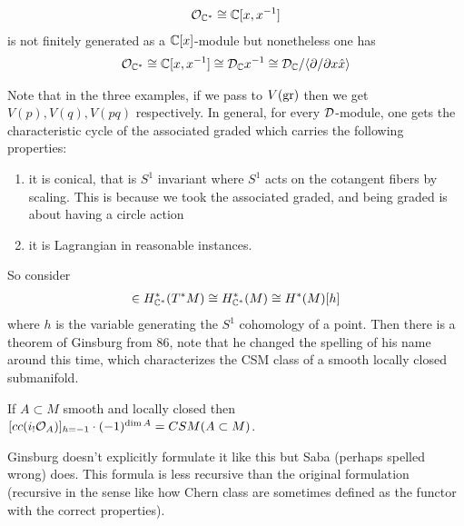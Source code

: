 \documentclass[12pt]{article}
\begin{document}
\begin{example}
    \begin{align*}
        {\mathcal{O}}_{\mathbb{C}^*} \cong \mathbb{C}[x,x^{-1}] 
    \end{align*} is not finitely generated as a $\mathbb{C}[x]$-module but nonetheless one has \begin{align*}
        {\mathcal{O}}_{\mathbb{C}^*} \cong \mathbb{C}[x,x^{-1}] \cong {\mathcal{D}}_{\mathbb{C}} {x}^{-1} \cong {\mathcal{D}}_{\mathbb{C}}/\langle{\partial/\partial x \hat{x}}\rangle
    \end{align*}
\end{example}
Note that in the three examples, if we pass to $V(\operatorname{gr})$ then we get $V(p), V(q), V(pq)$ respectively. In general, for every ${\mathcal{D}}$-module, one gets the characteristic cycle of the associated graded which carries the following properties: \begin{enumerate}
    \item it is conical, that is $S^1$ invariant where $S^1$ acts on the cotangent fibers by scaling. This is because we took the associated graded,
    and being graded is about having a circle action
    \item it is Lagrangian in reasonable instances.
\end{enumerate}
So consider \begin{align*}
    [cc(\cF)] \in H^*_{\C^*}(T^*M) \cong H^*_{\C^*}(M) \cong H^*(M)[h]
\end{align*} where $h$ is the variable generating the $S^1$ cohomology of a point. Then there is a theorem of Ginsburg from 86, note that he 
changed the spelling of his name around this time, which characterizes the CSM class of a smooth locally closed submanifold.

\begin{theorem}
    If $A\subset M$ smooth and locally closed then $[cc(i_!{\mathcal{O}}_A)]_{h=-1} \cdot (-1)^{\dim A} = CSM(A\subset M)$.
\end{theorem}
Ginsburg doesn't explicitly formulate it like this but Saba (perhaps spelled wrong) does. This formula is less recursive than the original formulation (recursive in the sense like how Chern class are sometimes defined as the functor with the correct properties).
\end{document}
